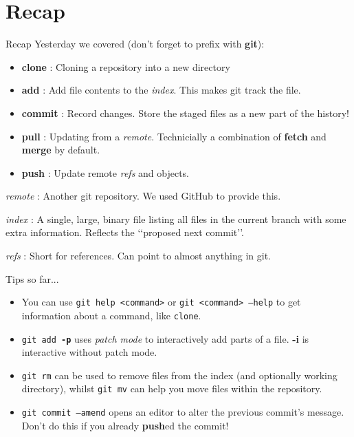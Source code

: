 \documentclass{beamer}
\begin{document}
\section{Recap}
\begin{frame}[fragile]{Recap}
  Yesterday we covered (don't forget to prefix with \textbf{git}):
  \begin{itemize}
    \item \textbf{clone} : Cloning a repository into a new directory
    \item \textbf{add} : Add file contents to the \textit{index}. This makes git track the file.
    \item \textbf{commit} : Record changes. Store the staged files as a new part of the history!
    \item \textbf{pull} : Updating from a \textit{remote}. Technicially a combination of \textbf{fetch} and \textbf{merge} by default.
    \item \textbf{push} : Update remote \textit{refs} and objects.
  \end{itemize}
  
  \textit{remote} : Another git repository. We used GitHub to provide this.
  
  \textit{index} : A single, large, binary file listing all files in the current branch with some extra information. Reflects the \lq\lq{}proposed next commit\rq\rq{}.
  
  \textit{refs} : Short for references. Can point to almost anything in git.
\end{frame}

\begin{frame}[fragile]{Tips so far...}
  \begin{itemize}
    \item You can use \texttt{git help <command>} or \texttt{git <command> --help} to get information about a command, like \texttt{clone}.
    \item \texttt{git add \textbf{-p}} uses \textit{patch mode} to interactively add parts of a file. \textbf{-i} is interactive without patch mode.
    \item \texttt{git rm} can be used to remove files from the index (and optionally working directory), whilst \texttt{git mv} can help you move files within the repository.
    \item \texttt{git commit --amend} opens an editor to alter the previous commit's message. Don't do this if you already \textbf{push}ed the commit!
  \end{itemize}
\end{frame}
\end{document}
